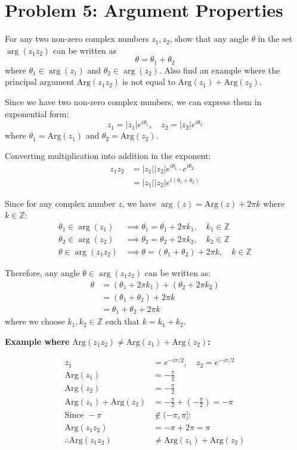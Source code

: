\documentclass{article}
\begin{document}
\section*{Problem 5: Argument Properties}

For any two non-zero complex numbers $z_1, z_2$, show that any angle $\theta$ in the set $\arg{(z_1z_2)}$ can be written as
\[ \theta = \theta_1 + \theta_2 \]
where $\theta_1 \in \arg(z_1)$ and $\theta_2 \in \arg(z_2)$. Also find an example where the principal argument $\text{Arg} (z_1z_2)$ is not equal to $\text{Arg} (z_1) + \text{Arg} (z_2)$.


Since we have two non-zero complex numbers, we can express them in exponential form:
$$z_1 = |z_1|e^{i\theta_1}, \quad z_2 = |z_2|e^{i\theta_2}$$
where $\theta_1 = \text{Arg}(z_1)$ and $\theta_2 = \text{Arg}(z_2)$.

Converting multiplication into addition in the exponent:
\begin{align*}
z_1z_2 &= |z_1||z_2|e^{i\theta_1} \cdot e^{i\theta_2} \\
&= |z_1||z_2|e^{i(\theta_1 + \theta_2)}
\end{align*}

Since for any complex number $z$, we have $\arg(z) = \text{Arg}(z) + 2\pi k$ where $k \in \mathbb{Z}$:
\begin{align*}
\theta_1 \in \arg(z_1) &\implies \theta_1 = \theta_1 + 2\pi k_1, \quad k_1 \in \mathbb{Z} \\
\theta_2 \in \arg(z_2) &\implies \theta_2 = \theta_2 + 2\pi k_2, \quad k_2 \in \mathbb{Z} \\
\theta \in \arg(z_1z_2) &\implies \theta = (\theta_1 + \theta_2) + 2\pi k, \quad k \in \mathbb{Z}
\end{align*}

Therefore, any angle $\theta \in \arg(z_1z_2)$ can be written as:
\begin{align*}
\theta &= (\theta_1 + 2\pi k_1) + (\theta_2 + 2\pi k_2) \\
 &= (\theta_1 + \theta_2) + 2\pi k\\
&= \theta_1 + \theta_2+ 2\pi k
\end{align*}
where we choose $k_1, k_2 \in \mathbb{Z}$ such that $k = k_1 + k_2$.

\newpage
\textbf{Example where } $\text{Arg}(z_1z_2) \neq \text{Arg}(z_1) + \text{Arg}(z_2)$\textbf{:}

\begin{align*}
z_1 &= e^{-i\pi/2}, \quad z_2 = e^{-i\pi/2} \\
\text{Arg}(z_1) &= -\frac{\pi}{2} \\
\text{Arg}(z_2) &= -\frac{\pi}{2} \\
\text{Arg}(z_1) + \text{Arg}(z_2) &= -\frac{\pi}{2} + \left(-\frac{\pi}{2}\right) = -\pi \\
\text{Since } -\pi &\notin (-\pi, \pi]: \\
\text{Arg}(z_1z_2) &= -\pi + 2\pi = \pi \\
\therefore \text{Arg}(z_1z_2) &\neq \text{Arg}(z_1) + \text{Arg}(z_2)
\end{align*}
\end{document}
